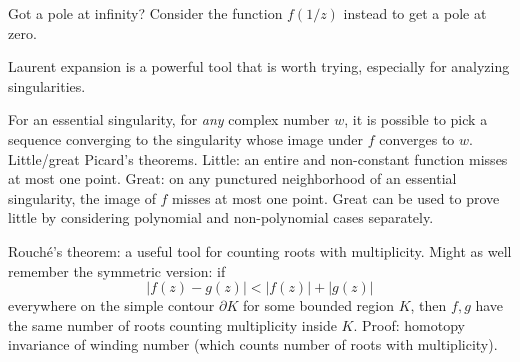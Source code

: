 Got a pole at infinity? Consider the function $f(1/z)$ instead to get a pole at zero.

Laurent expansion is a powerful tool that is worth trying, especially for analyzing singularities.

For an essential singularity, for \emph{any} complex number $w$, it is possible to pick a sequence converging to the singularity whose image under $f$ converges to $w$. Little/great Picard's theorems. Little: an entire and non-constant function misses at most one point. Great: on any punctured neighborhood of an essential singularity, the image of $f$ misses at most one point. Great can be used to prove little by considering polynomial and non-polynomial cases separately.

Rouch\'e's theorem: a useful tool for counting roots with multiplicity. Might as well remember the symmetric version: if
\[
	|f(z)-g(z)| < |f(z)| + |g(z)|
\]
everywhere on the simple contour $\partial K$ for some bounded region $K$, then $f,g$ have the same number of roots counting multiplicity inside $K$. Proof: homotopy invariance of winding number (which counts number of roots with multiplicity).